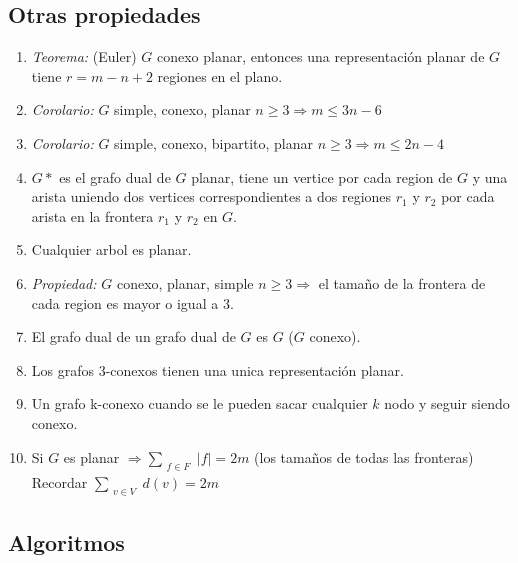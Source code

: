 \subsection{Otras propiedades}
\begin{enumerate}
\item \textit{Teorema:} (Euler) $G$ conexo planar, entonces una representación planar de $G$ tiene $r=m-n+2$ regiones en el plano.
\item \textit{Corolario:} $G$ simple, conexo, planar $n \geq 3 \Rightarrow m \leq 3n-6$
\item \textit{Corolario:} $G$ simple, conexo, bipartito, planar $n \geq 3 \Rightarrow m \leq 2n-4$
\item $G*$ es el grafo dual de $G$ planar, tiene un vertice por cada region de $G$ y una arista uniendo dos vertices correspondientes a dos regiones $r_{1}$ y $r_{2}$ por cada arista en la frontera $r_{1}$ y $r_{2}$ en $G$.
\item Cualquier arbol es planar.
\item \textit{Propiedad:} $G$ conexo, planar, simple $n \geq 3 \Rightarrow$ el tamaño de la frontera de cada region es mayor o igual a $3$.
\item El grafo dual de un grafo dual de $G$ es $G$ ($G$ conexo).
\item Los grafos 3-conexos tienen una unica representación planar.
\item Un grafo k-conexo cuando se le pueden sacar cualquier $k$ nodo y seguir siendo conexo.
\item Si $G$ es planar $\Rightarrow \sum_{\substack{f \in F}}|f| = 2m$ (los tamaños de todas las fronteras) Recordar $\sum_{\substack{v \in V}}d(v) = 2m$
\end{enumerate}

\subsection{Algoritmos}
